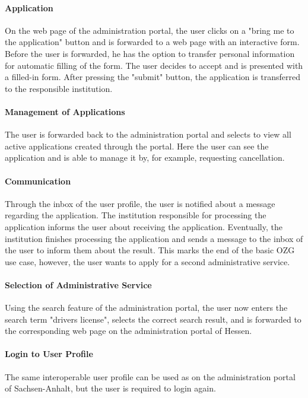 \paragraph{Application} On the web page of the administration portal, the user clicks on a "bring me to the application" button and is forwarded to a web page with an interactive form. Before the user is forwarded, he has the option to transfer personal information for automatic filling of the form. The user decides to accept and is presented with a filled-in form. After pressing the "submit" button, the application is transferred to the responsible institution.
    
\paragraph{Management of Applications} The user is forwarded back to the administration portal and selects to view all active applications created through the portal. Here the user can see the application and is able to manage it by, for example, requesting cancellation.
    
\paragraph{Communication} Through the inbox of the user profile, the user is notified about a message regarding the application. The institution responsible for processing the application informs the user about receiving the application. Eventually, the institution finishes processing the application and sends a message to the inbox of the user to inform them about the result. This marks the end of the basic OZG use case, however, the user wants to apply for a second administrative service.

\paragraph{Selection of Administrative Service} Using the search feature of the administration portal, the user now enters the search term "drivers license", selects the correct search result, and is forwarded to the corresponding web page on the administration portal of Hessen. 

\paragraph{Login to User Profile} The same interoperable user profile can be used as on the administration portal of Sachsen-Anhalt, but the user is required to login again.

